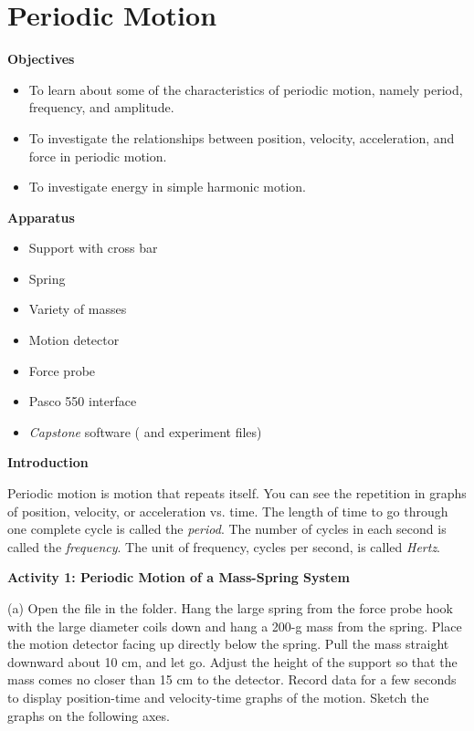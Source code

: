 \section{Periodic Motion}

\makelabheader %

\medskip
\textbf{Objectives }
\begin{itemize}[nosep]
\item To learn about some of the characteristics of periodic motion, namely period, frequency, and amplitude. 
\item To investigate the relationships between position, velocity, acceleration, and force in periodic motion. 
\item To investigate energy in simple harmonic motion.
\end{itemize}

\medskip
\textbf{Apparatus} 
\begin{itemize}[nosep]
\item Support with cross bar
\item Spring
\item Variety of masses 
\item Motion detector 
\item Force probe
\item Pasco 550 interface
\item \textit{Capstone} software ( and  experiment files)
\end{itemize}

\medskip
\textbf{Introduction }

Periodic motion is motion that repeats itself. You can see the repetition in
graphs of position, velocity, or acceleration vs. time. The length of time to
go through one complete cycle is called the \textit{period}. The
number of cycles in each second is called the \textit{frequency}. The unit of frequency,
cycles per second, is called \textit{Hertz}.

\bigskip
\textbf{Activity 1: Periodic Motion of a Mass-Spring System} 

(a) Open the file  in the \filename{\coursefolder} folder. Hang the large spring from the force probe hook with the large diameter coils down and hang a 200-g mass from the spring.  Place the motion detector facing up directly below the spring. Pull the mass straight downward about 10 cm, and let go. 
Adjust the height of the support so that the mass comes no closer than 15 cm 
to the detector. Record data for a few seconds to display position-time and 
velocity-time graphs of the motion. Sketch the graphs on the following axes.

